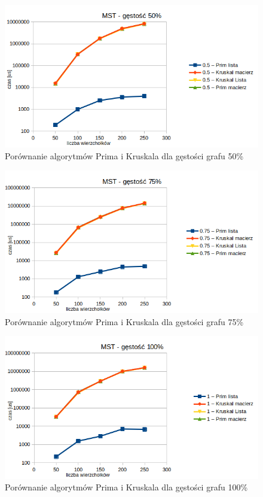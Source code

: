 \documentclass[11pt]{article}
\begin{document}
\begin{figure}[H]
    \includegraphics[width=13cm]{images/mst50.png}
    \caption{ Porównanie algorytmów Prima i Kruskala dla gęstości grafu 50\%}
\end{figure}


\begin{figure}[H]
    \includegraphics[width=13cm]{images/mst75.png}
    \caption{ Porównanie algorytmów Prima i Kruskala dla gęstości grafu 75\%}
\end{figure}


\begin{figure}[H]
    \includegraphics[width=13cm]{images/mst100.png}
    \caption{ Porównanie algorytmów Prima i Kruskala dla gęstości grafu 100\%}
\end{figure}
\end{document}
